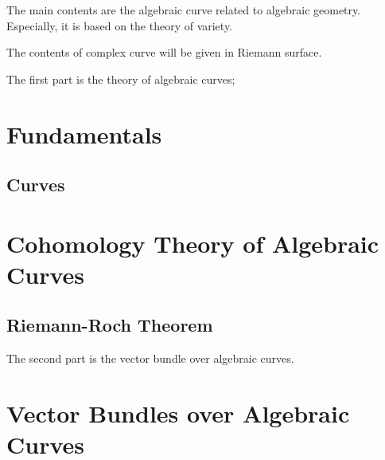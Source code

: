 \documentclass[Total.tex]{subfiles}
\begin{document}
	The main contents are the algebraic curve related to algebraic geometry. Especially, it is based on the theory of variety. 
	
	The contents of complex curve will be given in Riemann surface.
	
	\newpage The first part is the theory of algebraic curves;
	
	\chapter{Fundamentals}
		\section{Curves}
	
	
	
	\chapter{Cohomology Theory of Algebraic Curves}
		\section{Riemann-Roch Theorem}
	
	\newpage The second part is the vector bundle over algebraic curves.
	
	\chapter{Vector Bundles over Algebraic Curves} 
\end{document}
